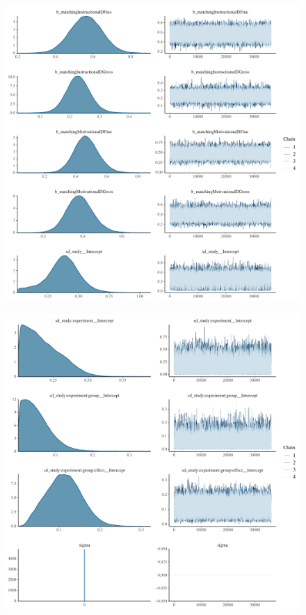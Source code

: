 \documentclass[
]{report}
\begin{document}
\begin{figure}

{\centering \includegraphics[width=1\textwidth,height=\textheight]{diagnostic_plots_files/figure-pdf/unnamed-chunk-14-1.pdf}

}

\end{figure}

\begin{figure}

{\centering \includegraphics[width=1\textwidth,height=\textheight]{diagnostic_plots_files/figure-pdf/unnamed-chunk-14-2.pdf}

}

\end{figure}
\end{document}
